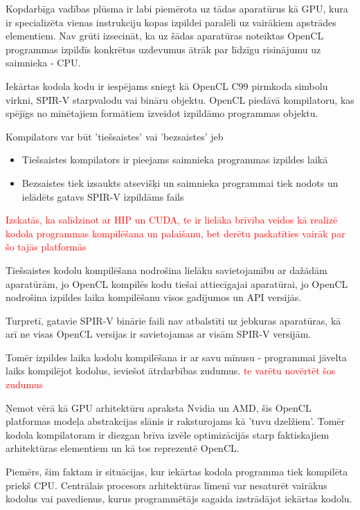 \documentclass[12pt]{report}%
\theoremstyle{definition}
\begin{document}
Kopdarbīga vadības plūsma ir labi piemērota uz tādas aparatūrus kā GPU, kura ir specializēta vienas instrukciju kopas izpildei paralēli uz vairākiem apstrādes elementiem.
Nav grūti izsecināt, ka uz šādas aparatūras noteiktas OpenCL programmas izpildīs konkrētus uzdevumus ātrāk par līdzīgu risinājumu uz saimnieka - CPU.

Iekārtas kodola kodu ir iespējams sniegt kā OpenCL C99 pirmkoda simbolu virkni, SPIR-V starpvalodu vai bināru objektu.
OpenCL piedāvā kompilatoru, kas spējīgs no minētajiem formātiem izveidot izpildāmo programmas objektu.

Kompilators var būt 'tiešsaistes' vai 'bezsaistes' jeb
\begin{itemize}
    \item Tiešsaistes kompilators ir pieejams saimnieka programmas izpildes laikā
    \item Bezsaistes tiek izsaukts atsevišķi un saimnieka programmai tiek nodots un ielādēts gatavs SPIR-V izpildāms fails 
\end{itemize}

\textcolor{red}{Izskatās, ka salīdzinot ar HIP un CUDA, te ir lielāka brīvība veidos kā realizē kodola programmas kompilēšana un palaišanu, bet derētu paskatīties vairāk par šo tajās platformās}

Tiešsaistes kodolu kompilēšana nodrošina lielāku savietojamību ar dažādām aparatūrām, jo OpenCL kompilēs kodu tiešai attiecīgajai aparatūrai,
jo OpenCL nodrošina izpildes laika kompilēšanu visos gadījumos un API versijās.

Turpretī, gatavie SPIR-V binārie faili nav atbalstīti uz jebkuras aparatūras, kā arī ne visas OpenCL versijas ir savietojamas ar visām SPIR-V versijām.

Tomēr izpildes laika kodolu kompilēšana ir ar savu mīnusu - programmai jāvelta laiks kompilējot kodolus, ieviešot ātrdarbības zudumus. \textcolor{red}{te varētu novērtēt šos zudumus}

Ņemot vērā kā GPU arhitektūru apraksta Nvidia un AMD, šis OpenCL platformas modeļa abstrakcijas slānis ir raksturojams kā 'tuvu dzelžiem'.
Tomēr kodola kompilatoram ir diezgan brīva izvēle optimizācijās starp faktiskajiem arhitektūras elementiem un kā tos reprezentē OpenCL.

Piemērs, šim faktam ir situācijas, kur iekārtas kodola programma tiek kompilēta priekš CPU. Centrālais procesors arhitektūras līmenī var nesaturēt
vairākus kodolus vai pavedienus, kurus programmētājs sagaida izstrādājot iekārtas kodolu.
\end{document}
